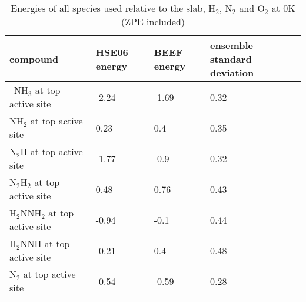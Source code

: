 \clearpage
\begin{center}
\renewcommand*{\arraystretch}{1.3}
\begin{longtable}{|m{5.8cm} |m{2.9cm}|m{2.9cm} |m{5.5cm} |} 
\caption{Energies of all species used relative to the slab, H$_2$, N$_2$ and O$_2$ at 0K (ZPE included)}
\label{tab:energies}
\endfirsthead
\endhead
\hline
compound & HSE06 energy & BEEF energy  & ensemble standard deviation \\ \hline\ 
NH$_{3}$ at top active site&-2.24&-1.69&0.32\\  
NH$_{2}$ at top active site&0.23&0.4&0.35\\  
N$_{2}$H at top active site&-1.77&-0.9&0.32\\  
N$_{2}$H$_{2}$ at top active site&0.48&0.76&0.43\\  
H$_{2}$NNH$_{2}$ at top active site&-0.94&-0.1&0.44\\  
H$_{2}$NNH at top active site&-0.21&0.4&0.48\\  
N$_{2}$ at top active site&-0.54&-0.59&0.28\\  
 \hline \end{longtable}
\end{center}
